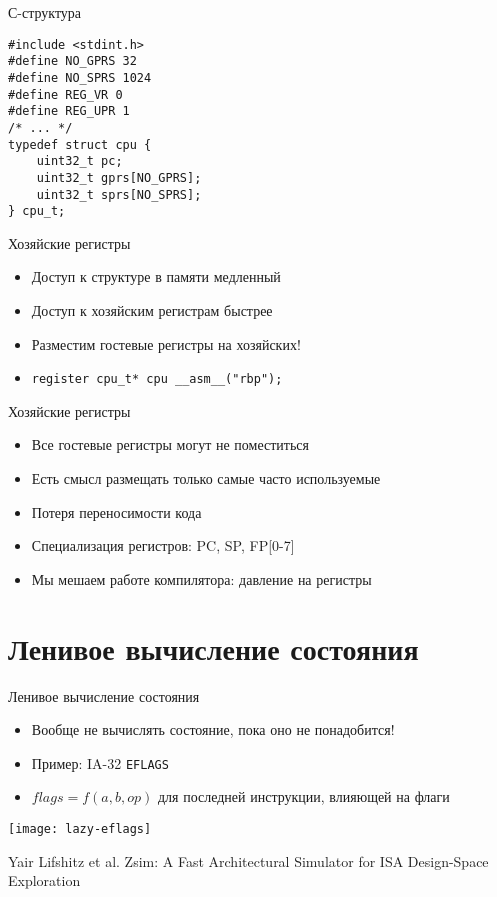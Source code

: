 \begin{frame}[fragile]{С-структура}
\begin{verbatim}
#include <stdint.h>
#define NO_GPRS 32
#define NO_SPRS 1024
#define REG_VR 0
#define REG_UPR 1
/* ... */
typedef struct cpu {
    uint32_t pc;
    uint32_t gprs[NO_GPRS];
    uint32_t sprs[NO_SPRS];
} cpu_t;
\end{verbatim}

\end{frame}

\begin{frame}{Хозяйские регистры}
\begin{itemize}
\item Доступ к структуре в памяти медленный
\item Доступ к хозяйским регистрам быстрее
\item Разместим гостевые регистры на хозяйских!
\item \texttt{register cpu_t* cpu __asm__("rbp");}
\end{itemize}
\end{frame}

\begin{frame}[fragile]{Хозяйские регистры}
\begin{itemize}
\item Все гостевые регистры могут не поместиться
\item Есть смысл размещать только самые часто используемые
\item Потеря переносимости кода
\item Специализация регистров: PC, SP, FP[0-7]
\item Мы мешаем работе компилятора: давление на регистры
\end{itemize}
\end{frame}

\section{Ленивое вычисление состояния}
\begin{frame}{Ленивое вычисление состояния}
\begin{itemize}
\item Вообще не вычислять состояние, пока оно не понадобится!
\item Пример: IA-32 \texttt{EFLAGS}
\item $flags = f(a, b, op)$ для последней инструкции, влияющей на флаги
\end{itemize}

\centering
\texttt{[image: lazy-eflags]}

\tiny{Yair Lifshitz et al. Zsim: A Fast Architectural Simulator for ISA Design-Space Exploration}
\end{frame}

